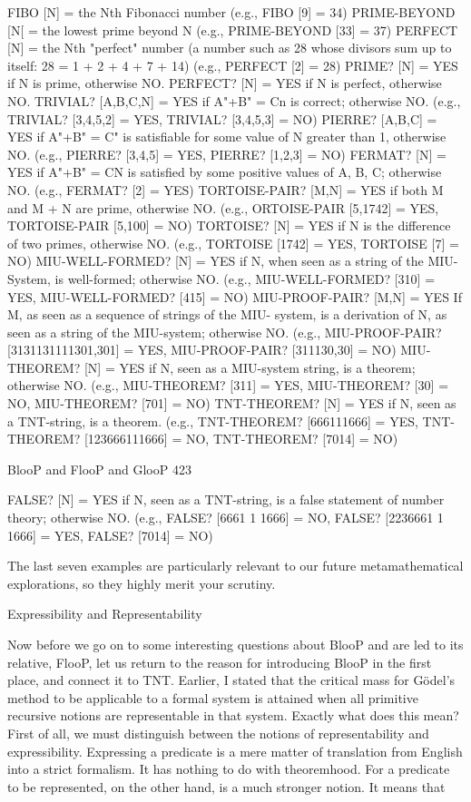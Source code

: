 FIBO [N] = the Nth Fibonacci number
(e.g., FIBO [9] = 34)
PRIME-BEYOND [N[ = the lowest prime beyond N
(e.g., PRIME-BEYOND [33] = 37)
PERFECT [N] = the Nth "perfect" number (a number such as 28 whose divisors sum up
to itself: 28 = 1 + 2 + 4 + 7 + 14)
(e.g., PERFECT [2] = 28)
PRIME? [N] = YES if N is prime, otherwise NO.
PERFECT? [N] = YES if N is perfect, otherwise NO.
TRIVIAL? [A,B,C,N] = YES if A"+B" = Cn is correct; otherwise NO.
(e.g., TRIVIAL? [3,4,5,2] = YES,
         TRIVIAL? [3,4,5,3] = NO)
PIERRE? [A,B,C] = YES if A"+B" = C" is satisfiable for some value of N greater than
1, otherwise NO.
(e.g., PIERRE? [3,4,5] = YES,
         PIERRE? [1,2,3] = NO)
FERMAT? [N] = YES if A"+B" = CN is satisfied by some positive
values of A, B, C; otherwise NO.
(e.g., FERMAT? [2] = YES)
TORTOISE-PAIR? [M,N] = YES if both M and M + N are prime, otherwise NO.
(e.g., ORTOISE-PAIR [5,1742] = YES,
         TORTOISE-PAIR [5,100] = NO)
TORTOISE? [N] = YES if N is the difference of two primes, otherwise NO.
(e.g., TORTOISE [1742] = YES,
         TORTOISE [7] = NO)
MIU-WELL-FORMED? [N] = YES if N, when seen as a string of the MIU-System, is
well-formed; otherwise NO.
(e.g., MIU-WELL-FORMED? [310] = YES,
         MIU-WELL-FORMED? [415] = NO)
MIU-PROOF-PAIR? [M,N] = YES If M, as seen as a sequence of strings of the MIU-
system, is a derivation of N, as seen as a string of the MIU-system; otherwise NO.
(e.g., MIU-PROOF-PAIR? [3131131111301,301] = YES,
         MIU-PROOF-PAIR? [311130,30] = NO)
MIU-THEOREM? [N] = YES if N, seen as a MIU-system string, is a theorem;
otherwise NO.
(e.g., MIU-THEOREM? [311] = YES,
         MIU-THEOREM? [30] = NO,
         MIU-THEOREM? [701] = NO)
TNT-THEOREM? [N] = YES if N, seen as a TNT-string, is a theorem.
(e.g., TNT-THEOREM? [666111666] = YES,
         TNT-THEOREM? [123666111666] = NO,
         TNT-THEOREM? [7014] = NO)




BlooP and FlooP and GlooP                                                      423

FALSE? [N] = YES if N, seen as a TNT-string, is a false statement of number theory;
otherwise NO.
(e.g., FALSE? [6661 1 1666] = NO,
       FALSE? [2236661 1 1666] = YES,
       FALSE? [7014] = NO)

The last seven examples are particularly relevant to our future metamathematical
explorations, so they highly merit your scrutiny.

                          Expressibility and Representability

Now before we go on to some interesting questions about BlooP and are led to its
relative, FlooP, let us return to the reason for introducing BlooP in the first place, and
connect it to TNT. Earlier, I stated that the critical mass for Gödel’s method to be
applicable to a formal system is attained when all primitive recursive notions are
representable in that system. Exactly what does this mean? First of all, we must
distinguish between the notions of representability and expressibility. Expressing a
predicate is a mere matter of translation from English into a strict formalism. It has
nothing to do with theoremhood. For a predicate to be represented, on the other hand, is a
much stronger notion. It means that

